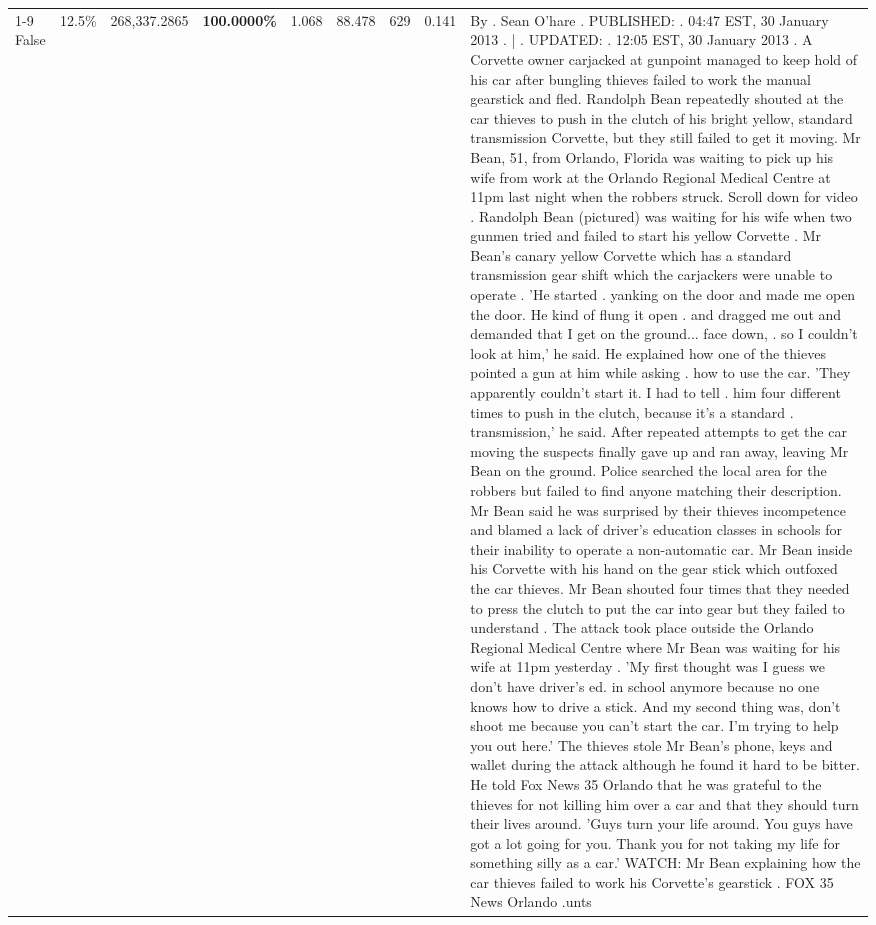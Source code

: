 \begin{table}[H]
\begin{tabular}{lllrlllll}
\cline{1-9} \cline{2-9}
False & 12.5\% & \color{red} 268,337.2865 & \bfseries \color{red} 100.0000\% & 1.068 & 88.478 & 629 & 0.141 & By . Sean O'hare . PUBLISHED: . 04:47 EST, 30 January 2013 . | . UPDATED: . 12:05 EST, 30 January 2013 . A Corvette owner carjacked at gunpoint managed to keep hold of his car after bungling thieves failed to work the manual gearstick and fled. Randolph Bean repeatedly shouted at the car thieves to push in the clutch of his bright yellow, standard transmission Corvette, but they still failed to get it moving. Mr Bean, 51, from Orlando, Florida was waiting to pick up his wife from work at the Orlando Regional Medical Centre at 11pm last night when the robbers struck. Scroll down for video . Randolph Bean (pictured) was waiting for his wife when two gunmen tried and failed to start his yellow Corvette . Mr Bean's canary yellow Corvette which has a standard transmission gear shift which the carjackers were unable to operate . 'He started . yanking on the door and made me open the door. He kind of flung it open . and dragged me out and demanded that I get on the ground... face down, . so I couldn't look at him,' he said. He explained how one of the thieves pointed a gun at him while asking . how to use the car. 'They apparently couldn't start it. I had to tell . him four different times to push in the clutch, because it's a standard . transmission,' he said. After repeated attempts to get the car moving the suspects finally gave up and ran away, leaving Mr Bean on the ground. Police searched the local area for the robbers but failed to find anyone matching their description. Mr Bean said he was surprised by their thieves incompetence and blamed a lack of driver's education classes in schools for their inability to operate a non-automatic car. Mr Bean inside his Corvette with his hand on the gear stick which outfoxed the car thieves. Mr Bean shouted four times that they needed to press the clutch to put the car into gear but they failed to understand . The attack took place outside the Orlando Regional Medical Centre where Mr Bean was waiting for his wife at 11pm yesterday . 'My first thought was I guess we don't have driver's ed. in school anymore because no one knows how to drive a stick. And my second thing was, don't shoot me because you can't start the car. I'm trying to help you out here.' The thieves stole Mr Bean's phone, keys and wallet during the attack although he found it hard to be bitter. He told Fox News 35 Orlando that he was grateful to the thieves for not killing him over a car and that they should turn their lives around. 'Guys turn your life around. You guys have got a lot going for you. Thank you for not taking my life for something silly as a car.' WATCH: Mr Bean explaining how the car thieves failed to work his Corvette's gearstick . FOX 35 News Orlando .unts \\

\end{tabular}
\end{table}
